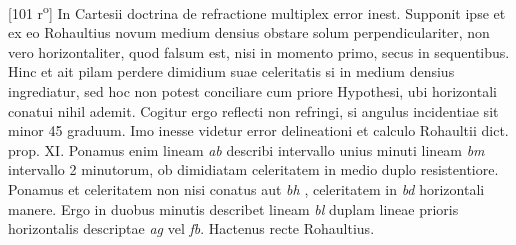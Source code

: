         \vspace*{8mm}
        \pstart 
        \normalsize
      [101 r\textsuperscript{o}] In Cartesii\protect{} doctrina de refractione\protect{} multiplex error inest. Supponit ipse et ex eo Rohaultius\protect{}  novum medium densius obstare solum perpendiculariter, non vero horizontaliter, quod falsum est, nisi in momento primo, secus in sequentibus. Hinc et  ait pilam perdere dimidium suae celeritatis\protect{} si in medium  densius ingrediatur, sed hoc non potest conciliare cum priore Hypothesi, ubi horizontali conatui nihil ademit. Cogitur ergo  reflecti non refringi, si angulus incidentiae\protect{} sit minor 45 graduum. Imo inesse videtur error delineationi et calculo Rohaultii\protect{} dict. prop. XI. Ponamus enim lineam \textit{ab} describi intervallo unius minuti lineam \textit{bm} intervallo 2 minutorum, ob dimidiatam celeritatem\protect{} in medio duplo resistentiore. Ponamus  et celeritatem\protect{} non nisi conatus  aut \textit{bh} , celeritatem in \textit{bd} horizontali manere. Ergo in duobus minutis describet lineam \textit{bl}  duplam lineae prioris horizontalis descriptae \textit{ag} vel \textit{fb}. Hactenus recte Rohaultius\protect{}.
